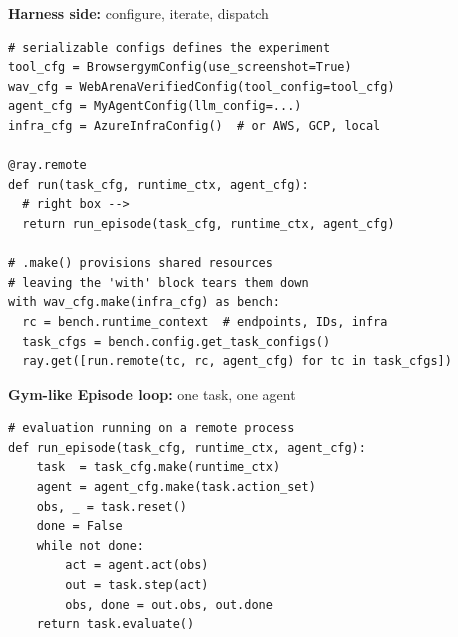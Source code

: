 \documentclass{article}
\begin{document}
\vspace{-5pt}
\noindent
\begin{minipage}[t]{0.48\columnwidth}
\vspace{0pt}%
{\scriptsize\centering\textbf{Harness side:} configure, iterate, dispatch\par\vspace{-5pt}}
\begin{tcolorbox}[colback=blue!3, colframe=blue!25, arc=2mm,
  boxrule=0.5pt, left=2mm, right=0mm, top=1mm, bottom=0.5mm, boxsep=0pt]
\begin{lstlisting}[basicstyle=\tiny\ttfamily, aboveskip=0pt, belowskip=0pt]
# serializable configs defines the experiment
tool_cfg = BrowsergymConfig(use_screenshot=True)
wav_cfg = WebArenaVerifiedConfig(tool_config=tool_cfg)
agent_cfg = MyAgentConfig(llm_config=...)
infra_cfg = AzureInfraConfig()  # or AWS, GCP, local

@ray.remote
def run(task_cfg, runtime_ctx, agent_cfg):
  # right box -->
  return run_episode(task_cfg, runtime_ctx, agent_cfg)

# .make() provisions shared resources
# leaving the 'with' block tears them down
with wav_cfg.make(infra_cfg) as bench:
  rc = bench.runtime_context  # endpoints, IDs, infra
  task_cfgs = bench.config.get_task_configs()
  ray.get([run.remote(tc, rc, agent_cfg) for tc in task_cfgs])
\end{lstlisting}
\end{tcolorbox}  
\end{minipage}
\hfill
\begin{minipage}[t]{0.48\columnwidth}
\vspace{0pt}
{\scriptsize\centering\textbf{Gym-like Episode loop:} one task, one agent\par\vspace{2pt}}
\begin{tcolorbox}[colback=blue!3, colframe=blue!25, arc=2mm,
  boxrule=0.5pt, left=2mm, right=0mm, top=1mm, bottom=0.5mm, boxsep=0pt]
\begin{lstlisting}[aboveskip=0pt, belowskip=0pt]
# evaluation running on a remote process
def run_episode(task_cfg, runtime_ctx, agent_cfg):
    task  = task_cfg.make(runtime_ctx)
    agent = agent_cfg.make(task.action_set)
    obs, _ = task.reset()
    done = False
    while not done:
        act = agent.act(obs)
        out = task.step(act)
        obs, done = out.obs, out.done
    return task.evaluate()
\end{lstlisting}
\end{tcolorbox}
\end{minipage}
\end{document}
